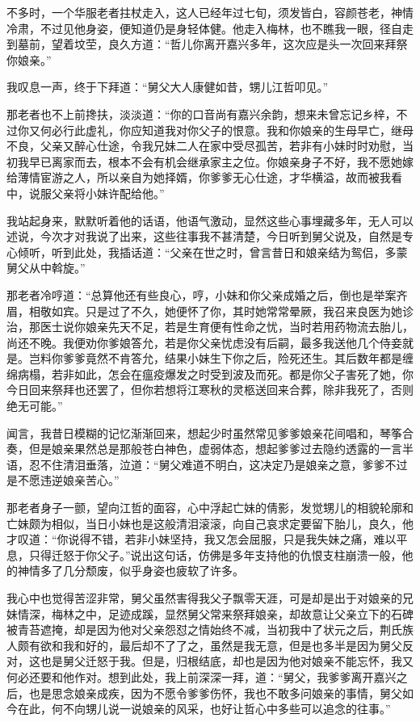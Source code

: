不多时，一个华服老者拄杖走入，这人已经年过七旬，须发皆白，容颜苍老，神情冷肃，不过见他身姿，便知道仍是身轻体健。他走入梅林，也不瞧我一眼，径自走到墓前，望着坟茔，良久方道：“哲儿你离开嘉兴多年，这次应是头一次回来拜祭你娘亲。”

我叹息一声，终于下拜道：“舅父大人康健如昔，甥儿江哲叩见。”

那老者也不上前搀扶，淡淡道：“你的口音尚有嘉兴余韵，想来未曾忘记乡梓，不过你又何必行此虚礼，你应知道我对你父子的恨意。我和你娘亲的生母早亡，继母不良，父亲又醉心仕途，令我兄妹二人在家中受尽孤苦，若非有小妹时时劝慰，当初我早已离家而去，根本不会有机会继承家主之位。你娘亲身子不好，我不愿她嫁给薄情宦游之人，所以亲自为她择婿，你爹爹无心仕途，才华横溢，故而被我看中，说服父亲将小妹许配给他。”

我站起身来，默默听着他的话语，他语气激动，显然这些心事埋藏多年，无人可以述说，今次才对我说了出来，这些往事我不甚清楚，今日听到舅父说及，自然是专心倾听，听到此处，我插话道：“父亲在世之时，曾言昔日和娘亲结为鸳侣，多蒙舅父从中斡旋。”

那老者冷哼道：“总算他还有些良心，哼，小妹和你父亲成婚之后，倒也是举案齐眉，相敬如宾。只是过了不久，她便怀了你，其时她常常晕厥，我召来良医为她诊治，那医士说你娘亲先天不足，若是生育便有性命之忧，当时若用药物流去胎儿，尚还不晚。我便劝你爹娘答允，若是你父亲忧虑没有后嗣，最多我送他几个侍妾就是。岂料你爹爹竟然不肯答允，结果小妹生下你之后，险死还生。其后数年都是缠绵病榻，若非如此，怎会在瘟疫爆发之时受到波及而死。都是你父子害死了她，你今日回来祭拜也还罢了，但你若想将江寒秋的灵柩送回来合葬，除非我死了，否则绝无可能。”

闻言，我昔日模糊的记忆渐渐回来，想起少时虽然常见爹爹娘亲花间唱和，琴筝合奏，但是娘亲果然总是那般苍白神色，虚弱体态，想起爹爹过去隐约透露的一言半语，忍不住清泪垂落，泣道：“舅父难道不明白，这决定乃是娘亲之意，爹爹不过是不愿违逆娘亲苦心。”

那老者身子一颤，望向江哲的面容，心中浮起亡妹的倩影，发觉甥儿的相貌轮廓和亡妹颇为相似，当日小妹也是这般清泪滚滚，向自己哀求定要留下胎儿，良久，他才叹道：“你说得不错，若非小妹坚持，我又怎会屈服，只是我失妹之痛，难以平息，只得迁怒于你父子。”说出这句话，仿佛是多年支持他的仇恨支柱崩溃一般，他的神情多了几分颓废，似乎身姿也疲软了许多。

我心中也觉得苦涩非常，舅父虽然害得我父子飘零天涯，可是却是出于对娘亲的兄妹情深，梅林之中，足迹成蹊，显然舅父常来祭拜娘亲，却故意让父亲立下的石碑被青苔遮掩，却是因为他对父亲怨怼之情始终不减，当初我中了状元之后，荆氏族人颇有欲和我和好的，最后却不了了之，虽然是我无意，但是也多半是因为舅父反对，这也是舅父迁怒于我。但是，归根结底，却也是因为他对娘亲不能忘怀，我又何必还要和他作对。想到此处，我上前深深一拜，道：“舅父，我爹爹离开嘉兴之后，也是思念娘亲成疾，因为不愿令爹爹伤怀，我也不敢多问娘亲的事情，舅父如今在此，何不向甥儿说一说娘亲的风采，也好让哲心中多些可以追念的往事。”

